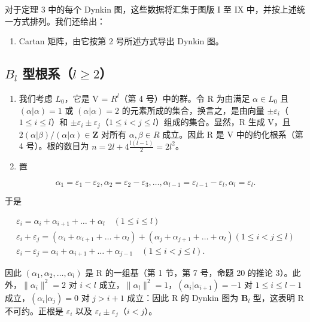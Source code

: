 对于定理 3 中的每个 Dynkin 图，这些数据将汇集于图版 I 至 IX 中，并按上述统一方式排列。我们还给出：

\begin{enumerate}
\def\labelenumi{(\Roman{enumi})}
\setcounter{enumi}{12}
\tightlist
\item
  Cartan 矩阵，由它按第 2 号所述方式导出 Dynkin 图。
\end{enumerate}

\subsection{\texorpdfstring{\(B_{l}\) 型根系（\(l \geqslant 2\)）}{B\_l 型根系 (l >= 2)}}

\begin{enumerate}
\def\labelenumi{(\Roman{enumi})}
\item
  我们考虑 \(L_{0}\)，它是 V = \(R^{l}\)（第 4 号）中的群。令 R 为由满足 \(\alpha \in L_{0}\) 且 \((\alpha|\alpha) = 1\) 或 \((\alpha|\alpha) = 2\) 的元素所成的集合，换言之，是由向量 \(\pm\varepsilon_{i}\)（\(1 \leqslant i \leqslant l\)）和 \(\pm\varepsilon_{i} \pm \varepsilon_{j}\)（\(1 \leqslant i < j \leqslant l\)）组成的集合。显然，R 生成 V，且 \(2(\alpha|\beta)/(\alpha|\alpha) \in \mathbf{Z}\) 对所有 \(\alpha, \beta \in R\) 成立。因此 R 是 V 中的约化根系（第 4 号）。根的数目为 \(n = 2l + 4\frac{l(l-1)}{2} = 2l^{2}\)。
\item
  置
\end{enumerate}

\[
\alpha_ {1} = \varepsilon_ {1} - \varepsilon_ {2}, \alpha_ {2} = \varepsilon_ {2} - \varepsilon_ {3}, \dots , \alpha_ {l - 1} = \varepsilon_ {l - 1} - \varepsilon_ {l}, \alpha_ {l} = \varepsilon_ {l}.
\]

于是

\[
\begin{array}{c} \varepsilon_ {i} = \alpha_ {i} + \alpha_ {i + 1} + \dots + \alpha_ {l} \quad (1 \leqslant i \leqslant l) \\ \varepsilon_ {i} + \varepsilon_ {j} = (\alpha_ {i} + \alpha_ {i + 1} + \dots + \alpha_ {l}) + (\alpha_ {j} + \alpha_ {j + 1} + \dots + \alpha_ {l}) (1 \leqslant i <   j \leqslant l) \\ \varepsilon_ {i} - \varepsilon_ {j} = \alpha_ {i} + \alpha_ {i + 1} + \dots + \alpha_ {j - 1} \quad (1 \leqslant i <   j \leqslant l). \end{array}
\]

因此 \((\alpha_{1},\alpha_{2},\ldots ,\alpha_{l})\) 是 R 的一组基（第 1 节，第 7 号，命题 20 的推论 3）。此外，\(\| \alpha_{i}\|^{2} = 2\) 对 \(i < l\) 成立，\(\| \alpha_l\| ^2 = 1\)，\((\alpha_i|\alpha_{i + 1}) = -1\) 对 \(1\leqslant i\leqslant l - 1\) 成立，\((\alpha_i|\alpha_j) = 0\) 对 \(j > i + 1\) 成立：因此 R 的 Dynkin 图为 \(\mathbf{B}_l\) 型，这表明 R 不可约。正根是 \(\varepsilon_{i}\) 以及 \(\varepsilon_{i}\pm \varepsilon_{j}\)（\(i < j\)）。

